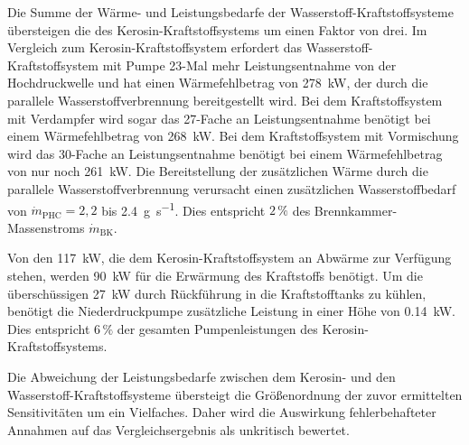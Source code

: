 Die Summe der Wärme- und Leistungsbedarfe der Wasserstoff-Kraftstoffsysteme übersteigen die des Kerosin-Kraftstoffsystems um einen Faktor von drei. Im Vergleich zum Kerosin-Kraftstoffsystem erfordert das Wasserstoff-Kraftstoffsystem mit Pumpe 23-Mal mehr Leistungsentnahme von der Hochdruckwelle und hat einen Wärmefehlbetrag von \SI{278}{\kilo\W}, der durch die parallele Wasserstoffverbrennung bereitgestellt wird. Bei dem Kraftstoffsystem mit Verdampfer wird sogar das 27-Fache an Leistungsentnahme benötigt bei einem Wärmefehlbetrag von \SI{268}{\kilo\W}. Bei dem Kraftstoffsystem mit Vormischung wird das 30-Fache an Leistungsentnahme benötigt bei einem Wärmefehlbetrag von nur noch \SI{261}{\kilo\W}. Die Bereitstellung der zusätzlichen Wärme durch die parallele Wasserstoffverbrennung verursacht einen zusätzlichen Wasserstoffbedarf von $\dot{m}_\mathrm{PHC}=2,2$ bis \SI{2.4}{\g\per\s}. Dies entspricht $2\,\%$ des Brennkammer-Massenstroms $\dot{m}_\mathrm{BK}$.

Von den \SI{117}{\kilo\W}, die dem Kerosin-Kraftstoffsystem an Abwärme zur Verfügung stehen, werden \SI{90}{\kilo\W} für die Erwärmung des Kraftstoffs benötigt. Um die überschüssigen \SI{27}{\kilo\W} durch Rückführung in die Kraftstofftanks zu kühlen, benötigt die Niederdruckpumpe zusätzliche Leistung in einer Höhe von \SI{0,14}{\kilo\W}. Dies entspricht $6\,\%$ der gesamten Pumpenleistungen des Kerosin-Kraftstoffsystems.

Die Abweichung der Leistungsbedarfe zwischen dem Kerosin- und den Wasserstoff-Kraftstoffsysteme übersteigt die Größenordnung der zuvor ermittelten Sensitivitäten um ein Vielfaches. Daher wird die Auswirkung fehlerbehafteter Annahmen auf das Vergleichsergebnis als unkritisch bewertet. 

